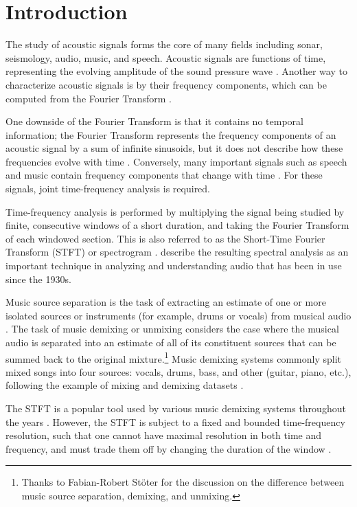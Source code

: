 \documentclass[report.tex]{subfiles}
\begin{document}
\section{Introduction}
\label{sec:intro}

The study of acoustic signals forms the core of many fields including sonar, seismology, audio, music, and speech. Acoustic signals are functions of time, representing the evolving amplitude of the sound pressure wave \parencite{melbook}. Another way to characterize acoustic signals is by their frequency components, which can be computed from the Fourier Transform \parencite{melbook}.

One downside of the Fourier Transform is that it contains no temporal information; the Fourier Transform represents the frequency components of an acoustic signal by a sum of infinite sinusoids, but it does not describe how these frequencies evolve with time \parencite{gabordiagrams}. Conversely, many important signals such as speech and music contain frequency components that change with time \parencite{gabor1946}. For these signals, joint time-frequency analysis is required.

Time-frequency analysis is performed by multiplying the signal being studied by finite, consecutive windows of a short duration, and taking the Fourier Transform of each windowed section. This is also referred to as the Short-Time Fourier Transform (STFT) or spectrogram \parencite{melbook}. \textcite{melbook} describe the resulting spectral analysis as an important technique in analyzing and understanding audio that has been in use since the 1930s.

Music source separation is the task of extracting an estimate of one or more isolated sources or instruments (for example, drums or vocals) from musical audio \parencite{musicsepgood, musicmask}. The task of music demixing or unmixing considers the case where the musical audio is separated into an estimate of all of its constituent sources that can be summed back to the original mixture.\footnote{Thanks to Fabian-Robert St{\"o}ter for the discussion on the difference between music source separation, demixing, and unmixing.} Music demixing systems commonly split mixed songs into four sources: vocals, drums, bass, and other (guitar, piano, etc.), following the example of mixing and demixing datasets \parencite{sisec2016, otherdataset2, musdb18, musdb18hq}.

The STFT is a popular tool used by various music demixing systems throughout the years \parencite{musicsepgood, musicmask, sisec2018, fitzgerald1, umx, plumbley1, plumbley2}. However, the STFT is subject to a fixed and bounded time-frequency resolution, such that one cannot have maximal resolution in both time and frequency, and must trade them off by changing the duration of the window \parencite{gabor1946, gabordiagrams}.
\end{document}
